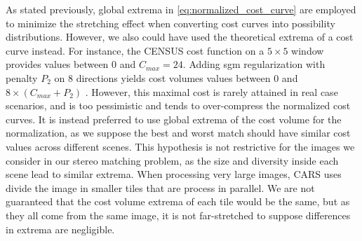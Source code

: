 As stated previously, global extrema in \cref{eq:normalized_cost_curve} are employed to minimize the stretching effect when converting cost curves into possibility distributions. However, we also could have used the theoretical extrema of a cost curve instead. For instance, the CENSUS cost function on a $5\times5$ window provides values between $0$ and $C_{max}=24$. Adding \acrshort{sgm} regularization with penalty $P_2$ on $8$ directions yields cost volumes values between $0$ and $8\times(C_{max}+P_2)$ \cite{hirschmuller_accurate_2005}. However, this maximal cost is rarely attained in real case scenarios, and is too pessimistic and tends to over-compress the normalized cost curves. It is instead preferred to use global extrema of the cost volume for the normalization, as we suppose the best and worst match should have similar cost values across different scenes. This hypothesis is not restrictive for the images we consider in our stereo matching problem, as the size and diversity inside each scene lead to similar extrema.  When processing very large images, CARS uses divide the image in smaller tiles that are process in parallel. We are not guaranteed that the cost volume extrema of each tile would be the same, but as they all come from the same image, it is not far-stretched to suppose differences in extrema are negligible. 

